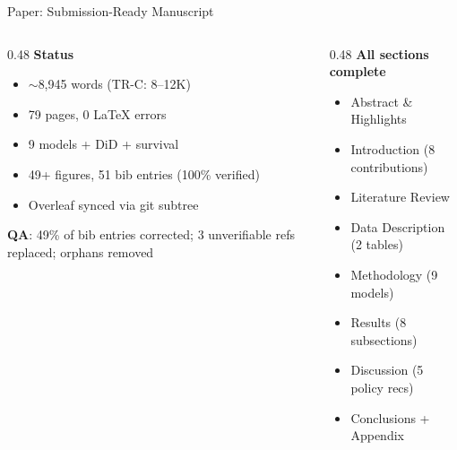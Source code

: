 \documentclass[aspectratio=169, 11pt]{beamer}
\begin{document}
\begin{frame}{Paper: Submission-Ready Manuscript}
\begin{columns}[T]
\begin{column}{0.48\textwidth}
\textbf{Status}
\begin{itemize}
\item $\sim$8,945 words (TR-C: 8--12K)
\item 79 pages, 0 \LaTeX{} errors
\item 9 models + DiD + survival
\item 49+ figures, 51 bib entries (100\% verified)
\item Overleaf synced via git subtree
\end{itemize}
\vspace{0.1cm}
\textbf{QA}: 49\% of bib entries corrected; 3 unverifiable refs replaced; orphans removed
\end{column}
\begin{column}{0.48\textwidth}
\textbf{All sections complete}
\begin{itemize}
\item[\checkmark] Abstract \& Highlights
\item[\checkmark] Introduction (8 contributions)
\item[\checkmark] Literature Review
\item[\checkmark] Data Description (2 tables)
\item[\checkmark] Methodology (9 models)
\item[\checkmark] Results (8 subsections)
\item[\checkmark] Discussion (5 policy recs)
\item[\checkmark] Conclusions + Appendix
\end{itemize}
\end{column}
\end{columns}
\end{frame}
\end{document}
